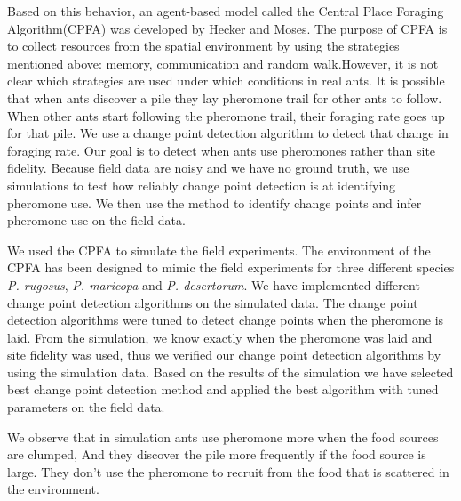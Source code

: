 Based on this behavior, an agent-based model called the Central Place Foraging Algorithm(CPFA)\cite{hecker2015beyond} was developed by Hecker and Moses. The purpose of CPFA is to collect resources from the spatial environment by using the strategies mentioned above: memory, communication and random walk\cite{collett2010desert,flanagan2012quantifying,letendre2013synergy}.However, it is not clear which strategies are used under which conditions in real ants\cite{tarasewich2002swarm}.  It is possible that when ants discover a pile they lay pheromone trail for other ants to follow. When other ants start following the pheromone trail, their foraging rate goes up for that pile. We use a change point detection algorithm to detect that change in foraging rate. Our goal is to detect when ants use pheromones rather than site fidelity. Because field data are noisy and we have no ground truth, we use simulations to test how reliably change point detection is at identifying pheromone use. We then use the method to identify change points and infer pheromone use on the field data.

We used the CPFA to simulate the field experiments. The environment of the CPFA has been designed to mimic the field experiments for three different species \textit{P. rugosus}, \textit{P. maricopa} and \textit{P. desertorum}. We have implemented different change point detection algorithms on the simulated data\cite{fryzlewicz2014wild, scott1974cluster, kukulski2000normal}. The change point detection algorithms were tuned to detect change points when the pheromone is laid. From the simulation, we know exactly when the pheromone was laid and site fidelity was used, thus we verified our change point detection algorithms by using the simulation data. Based on the results of the simulation we have selected best change point detection method and applied the best algorithm with tuned parameters on the field data. 

We observe that in simulation ants use pheromone more when the food sources are clumped, And they discover the pile more frequently if the food source is large. They don't use the pheromone to recruit from the food that is scattered in the environment. 


\clearpage
